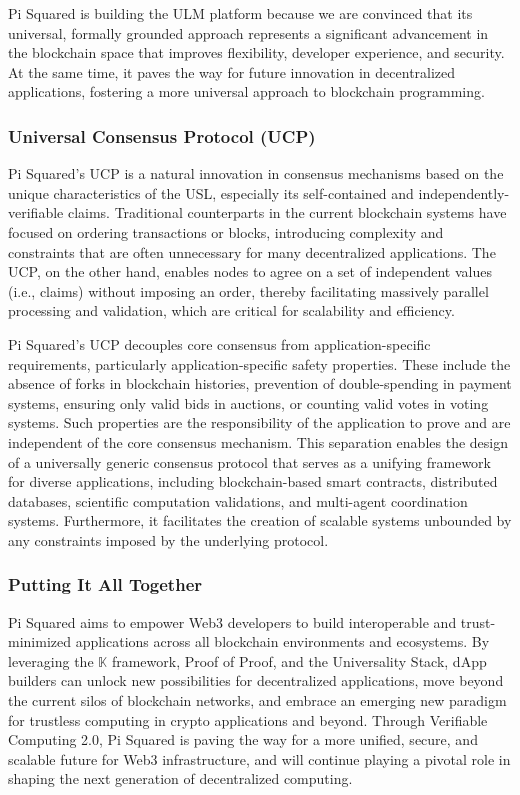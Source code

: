 \documentclass{article}
\newcommand{\K}{\ensuremath{\mathbb{K}}\xspace}
\newcommand{\ulm}{ULM}
\begin{document}
Pi Squared is building the \ulm{} platform because we are convinced that its universal, formally grounded approach represents a significant advancement in the blockchain space that improves flexibility, developer experience, and security. At the same time, it paves the way for future innovation in decentralized applications, fostering a more universal approach to blockchain programming.

\subsubsection{Universal Consensus Protocol (UCP)} 

Pi Squared's UCP is a natural innovation in consensus mechanisms 
based on the unique characteristics of the USL, especially its self-contained
and independently-verifiable claims. 
Traditional counterparts in the current blockchain systems have focused 
on ordering transactions or blocks, 
introducing complexity and constraints that are often unnecessary for many decentralized applications.
The UCP, on the other hand, enables nodes to agree on a set of independent values (i.e., claims)
without imposing an order, thereby facilitating massively parallel processing and validation, which are critical for scalability and efficiency. 

Pi Squared's UCP decouples core consensus from application-specific requirements, particularly application-specific safety properties. These include the absence of forks in blockchain histories, prevention of double-spending in payment systems, ensuring only valid bids in auctions, or counting valid votes in voting systems. Such properties are the responsibility of the application to prove and are independent of the core consensus mechanism. This separation enables the design of a universally generic consensus protocol that serves as a unifying framework for diverse applications, including blockchain-based smart contracts, distributed databases, scientific computation validations, and multi-agent coordination systems. Furthermore, it facilitates the creation of scalable systems unbounded by any constraints imposed by the underlying protocol.

\subsubsection{Putting It All Together}

Pi Squared aims to empower Web3 developers to build interoperable and trust-minimized applications across 
all blockchain environments and ecosystems. 
By leveraging the \K framework,
Proof of Proof, and the Universality Stack,
dApp builders can unlock new possibilities for decentralized applications, move beyond the current silos of blockchain networks, and embrace an emerging new paradigm for trustless computing in crypto applications and beyond.
Through Verifiable Computing 2.0, Pi Squared is paving the way for a more unified, secure, and scalable future for Web3 infrastructure, and will continue playing
a pivotal role in shaping the next generation of decentralized computing.
\end{document}
